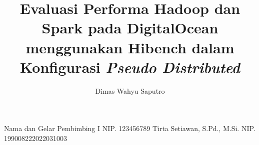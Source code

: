 \title{Evaluasi Performa Hadoop dan Spark pada DigitalOcean menggunakan Hibench dalam Konfigurasi \textit{Pseudo Distributed}} 	%
\author{Dimas Wahyu Saputro}		%
\dosbingB%
    {Nama dan Gelar Pembimbing I}%
    {NIP. 123456789}				%
\dosbingA%
    {Tirta Setiawan, S.Pd., M.Si.}%
    {NIP. 199008222022031003}				%

\setcounter{page}{0}

%
%
%
%
%
%
%
%
%

\tableofcontents

\cleardoublepage
{}
\listoffigures

\cleardoublepage
{}
\listoftables


%